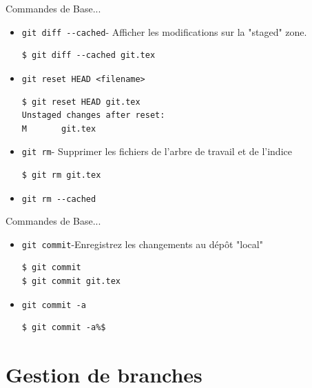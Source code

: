 \documentclass{beamer}
\begin{document}
\begin{frame}[containsverbatim]{Commandes de Base...}
  \begin{itemize}
\item \lstinline|git diff --cached|- Afficher les modifications sur la "staged" zone.
\begin{lstlisting}
$ git diff --cached git.tex
\end{lstlisting}

\item \lstinline|git reset HEAD <filename>| 
\begin{lstlisting}
$ git reset HEAD git.tex
Unstaged changes after reset:
M       git.tex
\end{lstlisting}

\item \lstinline|git rm|- Supprimer les fichiers de l'arbre de travail et de l'indice 
\begin{lstlisting}
$ git rm git.tex
\end{lstlisting}
\item \lstinline|git rm --cached|
    
  \end{itemize}
\end{frame}
\begin{frame}[containsverbatim]{Commandes de Base...}
  \begin{itemize}
\item \lstinline|git commit|-Enregistrez les changements au dépôt "local"
\begin{lstlisting}
$ git commit
$ git commit git.tex
\end{lstlisting}

\item \lstinline|git commit -a| 
\begin{lstlisting}
$ git commit -a%$
\end{lstlisting}
  
  \end{itemize}
\end{frame}


\section{Gestion de branches}
\end{document}
